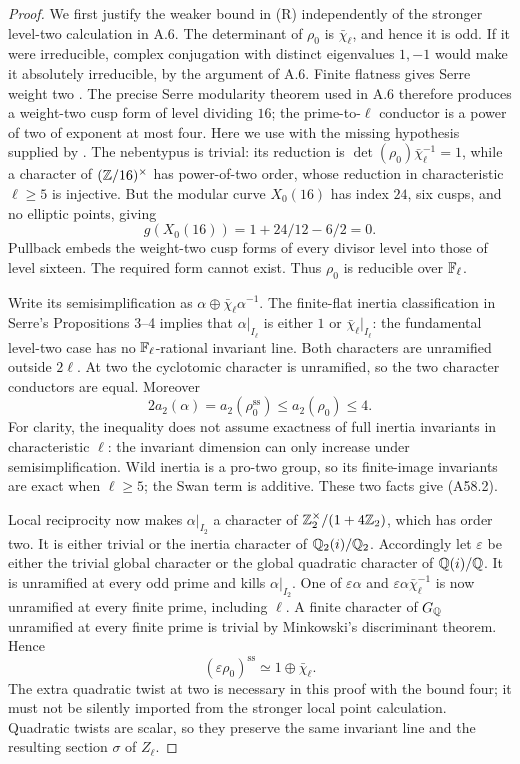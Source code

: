 \begin{proof}
We first justify the weaker bound in \textup{(R)} independently of the
stronger level-two calculation in A.6. The determinant of $\rho_0$
is $\bar\chi_\ell$, and hence it is odd. If it were irreducible,
complex conjugation with distinct eigenvalues $1,-1$ would make it
absolutely irreducible, by the argument of A.6. Finite flatness gives
Serre weight two \citep[Proposition 4]{AMSerre1987}. The precise Serre
modularity theorem used in A.6 therefore produces a weight-two cusp
form of level dividing $16$; the prime-to-$\ell$ conductor is a power
of two of exponent at most four. Here we use
\citet[Theorem 9.1]{AMKhareWintenbergerI2009} with the missing
hypothesis supplied by \citet[Corollary (0.2)]{AMKisin2009}.
The nebentypus is trivial: its reduction is
$\det(\rho_0)\bar\chi_\ell^{-1}=1$, while a character of
$(\mathbb Z/16)^\times$ has power-of-two order, whose reduction in
characteristic $\ell\ge5$ is injective. But the modular curve
$X_0(16)$ has index $24$, six cusps, and no elliptic points, giving
\[
 g(X_0(16))=1+24/12-6/2=0.
\]
Pullback embeds the weight-two cusp forms of every divisor level
into those of level sixteen. The required form cannot exist.
Thus $\rho_0$ is reducible over $\mathbb F_\ell$.

Write its semisimplification as
$\alpha\oplus\bar\chi_\ell\alpha^{-1}$.
The finite-flat inertia classification in Serre's Propositions 3--4
implies that $\alpha|_{I_\ell}$ is either $1$ or
$\bar\chi_\ell|_{I_\ell}$: the fundamental level-two case has no
$\mathbb F_\ell$-rational invariant line. Both characters are unramified
outside $2\ell$. At two the cyclotomic character is unramified, so
the two character conductors are equal. Moreover
\[
 2a_2(\alpha)
   =a_2(\rho_0^{\mathrm{ss}})
   \le a_2(\rho_0)\le4.
 \tag{A58.2}
\]
For clarity, the inequality does not assume exactness of full inertia
invariants in characteristic $\ell$: the invariant dimension can
only increase under semisimplification. Wild inertia is a pro-two
group, so its finite-image invariants are exact when $\ell\ge5$;
the Swan term is additive. These two facts give (A58.2).

Local reciprocity now makes $\alpha|_{I_2}$ a character of
$\mathbb Z_2^\times/(1+4\mathbb Z_2)$, which has order two. It is either trivial
or the inertia character of $\mathbb Q_2(i)/\mathbb Q_2$. Accordingly let
$\varepsilon$ be either the trivial global character or the global
quadratic character of $\mathbb Q(i)/\mathbb Q$. It is unramified at every odd
prime and kills $\alpha|_{I_2}$. One of
$\varepsilon\alpha$ and
$\varepsilon\alpha\bar\chi_\ell^{-1}$ is now unramified at every
finite prime, including $\ell$. A finite character of $G_\mathbb Q$
unramified at every finite prime is trivial by Minkowski's discriminant
theorem. Hence
\[
 (\varepsilon\rho_0)^{\mathrm{ss}}
       \simeq1\oplus\bar\chi_\ell.
 \tag{A58.3}
\]
The extra quadratic twist at two is necessary in this proof with the
bound four; it must not be silently imported from the stronger local
point calculation. Quadratic twists are scalar, so they preserve the
same invariant line and the resulting section $\sigma$ of $Z_\ell$.


\end{proof}
